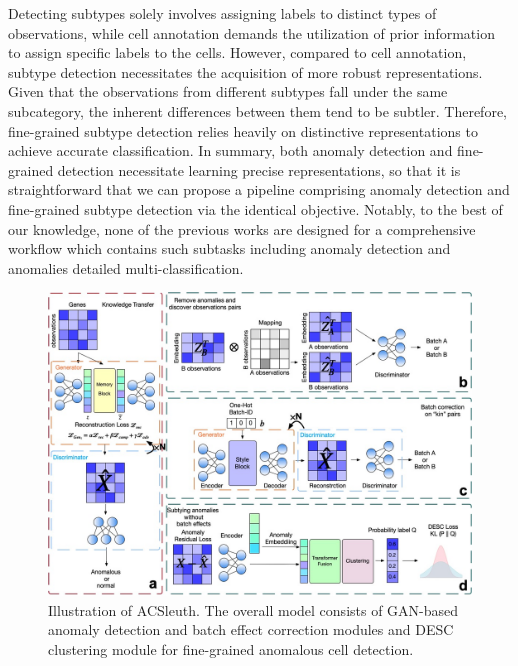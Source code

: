 \documentclass{article}
\begin{document}
Detecting subtypes solely involves assigning labels to distinct types of observations, 
while cell annotation demands the utilization of prior information to assign specific 
labels to the cells. However, compared to cell annotation, subtype detection necessitates 
the acquisition of more robust representations. Given that the observations from different 
subtypes fall under the same subcategory, the inherent differences between them tend to 
be subtler. Therefore, fine-grained subtype detection relies heavily on distinctive representations to 
achieve accurate classification. In summary, both anomaly detection and fine-grained detection 
necessitate learning precise representations, so that it is straightforward that we can 
propose a pipeline comprising anomaly detection and fine-grained subtype detection via the identical objective. 
Notably, to the best of our knowledge, none of the previous works are designed for a 
comprehensive workflow which contains such subtasks including anomaly detection and 
anomalies detailed multi-classification.
\begin{figure}
    \centering
    \includegraphics[scale=0.20]{Framework.jpg}
    \caption{Illustration of ACSleuth. The overall model consists of GAN-based anomaly detection and batch effect correction modules and DESC clustering module for fine-grained anomalous cell detection.}
\end{figure} 
\end{document}
